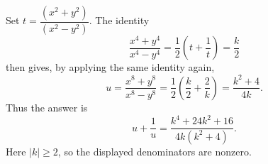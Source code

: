 Set $t=\dfrac{(x^2+y^2)}{(x^2-y^2)}$. The identity
\[
\dfrac{x^4+y^4}{x^4-y^4}=\dfrac{1}{2}\left(t+\dfrac{1}{t}\right)=\dfrac{k}{2}
\]
then gives, by applying the same identity again,
\[
u=\dfrac{x^8+y^8}{x^8-y^8}=\dfrac{1}{2}\left(\dfrac{k}{2}+\dfrac{2}{k}\right)=\dfrac{k^2+4}{4k}.
\]
Thus the answer is
\[
u+\dfrac{1}{u}=\boxed{\dfrac{k^4+24k^2+16}{4k(k^2+4)}}.
\]
Here $|k|\ge2$, so the displayed denominators are nonzero.

